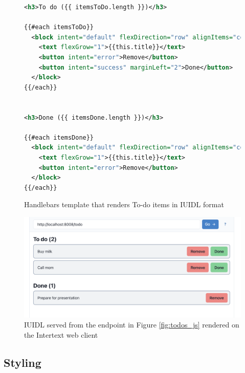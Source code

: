 \begin{figure}
\begin{minipage}{\linewidth}
\begin{lstlisting}[language=xml]
<h3>To do ({{ itemsToDo.length }})</h3>

{{#each itemsToDo}}
  <block intent="default" flexDirection="row" alignItems="center" paddingLeft="4">
    <text flexGrow="1">{{this.title}}</text>
    <button intent="error">Remove</button>
    <button intent="success" marginLeft="2">Done</button>
  </block>
{{/each}}


<h3>Done ({{ itemsDone.length }})</h3>

{{#each itemsDone}}
  <block intent="default" flexDirection="row" alignItems="center" paddingLeft="4">
    <text flexGrow="1">{{this.title}}</text>
    <button intent="error">Remove</button>
  </block>
{{/each}}
\end{lstlisting}
\end{minipage}
\caption{Handlebars template that renders To-do items in IUIDL format}%
\label{fig:todos_template}%
\end{figure}

\begin{figure}
  \centering
  \includegraphics[width=13cm]{thesis/paper/images/todos.png}
  \caption{IUIDL served from the endpoint in Figure \ref{fig:todos_js} rendered on the Intertext web client}%
  \label{fig:todos_output}%
\end{figure}

\subsection{Styling}


